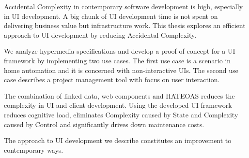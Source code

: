 Accidental Complexity in contemporary software development is high, especially in UI development. A big chunk of UI development time is not spent on delivering business value but infrastructure work. This thesis explores an efficient approach to UI development by reducing Accidental Complexity.

We analyze hypermedia specifications and develop a proof of concept for a UI framework by implementing two use cases. The first use case is a scenario in home automation and it is concerned with non-interactive UIs. The second use case describes a project management tool with focus on user interaction.

The combination of linked data, web components and HATEOAS reduces the complexity in UI and client development. Using the developed UI framework reduces \gls{cognitive load}, eliminates Complexity caused by State and Complexity caused by Control and significantly drives down maintenance costs.

The approach to UI development we describe constitutes an improvement to contemporary ways.
